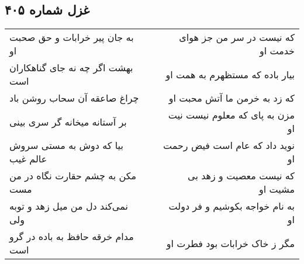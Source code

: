 \begin{center}
\section*{غزل شماره ۴۰۵}
\label{sec:sh405}
\begin{longtable}{l p{0.5cm} r}
به جان پیر خرابات و حق صحبت او
&&
که نیست در سر من جز هوای خدمت او
\\
بهشت اگر چه نه جای گناهکاران است
&&
بیار باده که مستظهرم به همت او
\\
چراغ صاعقه آن سحاب روشن باد
&&
که زد به خرمن ما آتش محبت او
\\
بر آستانه میخانه گر سری بینی
&&
مزن به پای که معلوم نیست نیت او
\\
بیا که دوش به مستی سروش عالم غیب
&&
نوید داد که عام است فیض رحمت او
\\
مکن به چشم حقارت نگاه در من مست
&&
که نیست معصیت و زهد بی مشیت او
\\
نمی‌کند دل من میل زهد و توبه ولی
&&
به نام خواجه بکوشیم و فر دولت او
\\
مدام خرقه حافظ به باده در گرو است
&&
مگر ز خاک خرابات بود فطرت او
\\
\end{longtable}
\end{center}
